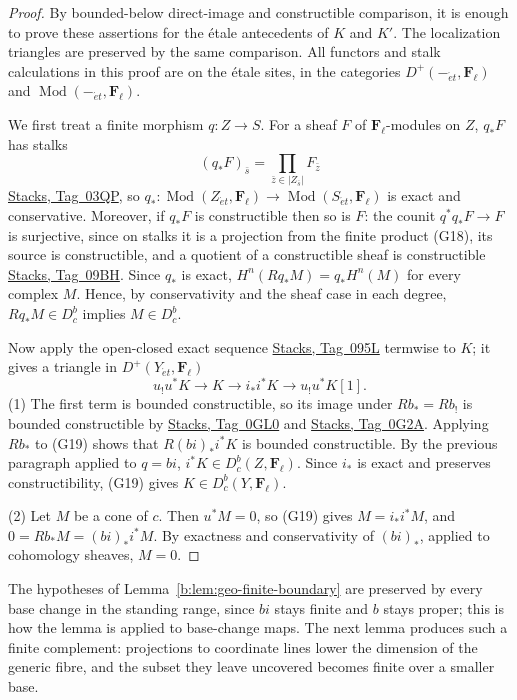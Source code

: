 \documentclass[11pt,a4paper]{article}
\numberwithin{equation}{section}
\theoremstyle{definition}
\theoremstyle{remark}
\newcommand{\Dbc}{D^b_c}
\newcommand{\Mod}{\operatorname{Mod}}
\newcommand{\Fell}{\mathbf F_\ell}
\newcommand{\et}{\acute{e}t}
\newcommand{\stacks}[1]{\href{https://stacks.math.columbia.edu/tag/#1}{\textnormal{Stacks, Tag~#1}}}
\begin{document}
\begin{proof}
By bounded-below direct-image and constructible comparison, it is
enough to prove these assertions for the \'etale antecedents of $K$
and $K'$. The localization triangles are preserved by the same
comparison. All functors and stalk calculations in this proof are
on the \'etale sites, in the categories \(D^+(-_{\et},\Fell)\) and
\(\Mod(-_{\et},\Fell)\).

We first treat a finite morphism \(q:Z\to S\). For a sheaf \(F\) of
\(\Fell\)-modules on \(Z\), \(q_*F\) has stalks
\[
 (q_*F)_{\bar s}
       =\prod_{\bar z\in |Z_{\bar s}|}F_{\bar z}
                                                               \tag{G18}
\]
\stacks{03QP}, so
\(q_*\colon\Mod(Z_{\et},\Fell)\to\Mod(S_{\et},\Fell)\) is exact and
conservative. Moreover, if
\(q_*F\) is constructible then so is \(F\): the counit
\(q^*q_*F\to F\) is surjective, since on stalks it is a projection from
the finite product (G18), its source is constructible, and a quotient of
a constructible sheaf is constructible \stacks{09BH}. Since \(q_*\) is
exact, \(H^n(Rq_*M)=q_*H^n(M)\) for every complex \(M\). Hence, by
conservativity and the sheaf case in each degree, \(Rq_*M\in\Dbc\)
implies \(M\in\Dbc\).

Now apply the open-closed exact sequence \stacks{095L} termwise to
\(K\); it gives a triangle in \(D^+(Y_{\et},\Fell)\)
\[
 u_!u^*K\longrightarrow K\longrightarrow i_*i^*K
       \longrightarrow u_!u^*K[1].                       \tag{G19}
\]
(1) The first term is bounded constructible, so its image under
\(Rb_*=Rb_!\) is bounded constructible by \stacks{0GL0} and
\stacks{0G2A}. Applying \(Rb_*\) to (G19) shows that
\(R(bi)_*i^*K\) is bounded constructible. By the previous paragraph
applied to \(q=bi\), \(i^*K\in\Dbc(Z,\Fell)\). Since \(i_*\) is exact
and preserves constructibility, (G19) gives \(K\in\Dbc(Y,\Fell)\).

(2) Let \(M\) be a cone of \(c\). Then \(u^*M=0\), so (G19) gives
\(M=i_*i^*M\), and \(0=Rb_*M=(bi)_*i^*M\). By exactness and
conservativity of \((bi)_*\), applied to cohomology sheaves, \(M=0\).
\end{proof}

The hypotheses of Lemma~\ref{b:lem:geo-finite-boundary} are preserved
by every base change in the standing range, since \(bi\) stays finite and \(b\)
stays proper; this is how the lemma is applied to base-change maps.
The next lemma produces such a finite complement: projections to
coordinate lines lower the dimension of the generic fibre, and the
subset they leave uncovered becomes finite over a smaller base.
\end{document}
